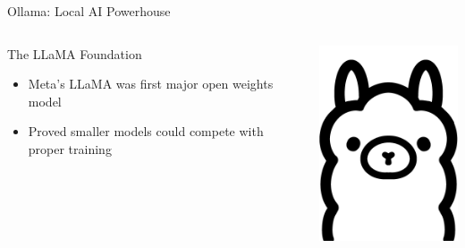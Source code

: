 \documentclass[aspectratio=169]{beamer}
\begin{document}
\begin{frame}{Ollama: Local AI Powerhouse}
\begin{columns}
\begin{block}{The LLaMA Foundation}
\begin{itemize}
    \item Meta's LLaMA was first major open weights model
    \item Proved smaller models could compete with proper training
\end{itemize}
\end{block}
\includegraphics[width=\linewidth]{ollama.png}
\end{columns}
\end{frame}
\end{document}
